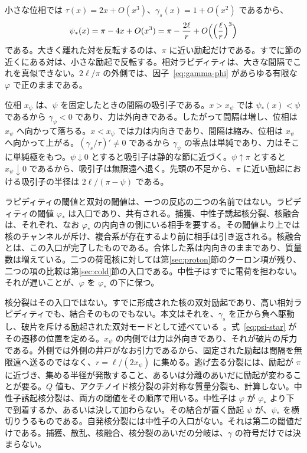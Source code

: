 \documentclass[a4paper]{article}
\begin{document}
小さな位相では \(\tau(x)=2x+O(x^{3})\)、\(\gamma_s(x)=1+O(x^{2})\) であるから、
\[
\psi_*(x)=\pi-4x+O(x^{3})=\pi-\frac{2\ell}{r}+O\Bigl(\Bigl(\frac{\ell}{r}\Bigr)^{3}\Bigr)
\]
である。大きく離れた対を反転するのは、\(\pi\) に近い励起だけである。すでに節の近くにある対は、小さな励起で反転する。相対ラピディティは、大きな間隔でこれを真似できない。\(2\ell/\pi\) の外側では、因子~\eqref{eq:gamma-phi} があらゆる有限な \(\varphi\) で正のままである。

位相 \(x_\psi\) は、\(\psi\) を固定したときの間隔の吸引子である。\(x>x_\psi\) では \(\psi_*(x)<\psi\) であるから \(\gamma_\psi<0\) であり、力は外向きである。したがって間隔は増し、位相は \(x_\psi\) へ向かって落ちる。\(x<x_\psi\) では力は内向きであり、間隔は縮み、位相は \(x_\psi\) へ向かって上がる。\((\gamma_s/\tau)'\neq 0\) であるから \(\gamma_\psi\) の零点は単純であり、力はそこに単純極をもつ。\(\psi\downarrow 0\) とすると吸引子は静的な節に近づく。\(\psi\uparrow\pi\) とすると \(x_\psi\downarrow 0\) であるから、吸引子は無限遠へ退く。先頭の不足から、\(\pi\) に近い励起における吸引子の半径は \(2\ell/(\pi-\psi)\) である。

ラピディティの閾値と双対の閾値は、一つの反応の二つの名前ではない。ラピディティの閾値 \(\varphi_*\) は入口であり、共有される。捕獲、中性子誘起核分裂、核融合は、それぞれ、なお \(\varphi_*\) の内向きの側にいる相手を要する。その閾値より上では核のチャンネルが斥け、複合系が存在するより前に相手は引き返される。核融合とは、この入口が完了したものである。合体した系は内向きのままであり、質量数は増えている。二つの荷電核に対しては第\ref{sec:proton}節のクーロン項が残り、二つの項の比較は第\ref{sec:cold}節の入口である。中性子はすでに電荷を担わない。それが遅いことが、\(\varphi\) を \(\varphi_*\) の下に保つ。

核分裂はその入口ではない。すでに形成された核の双対励起であり、高い相対ラピディティでも、結合そのものでもない。本文はそれを、\(\gamma_s\) を正から負へ駆動し、破片を斥ける励起された双対モードとして述べている~\cite{dst-main}。式~\eqref{eq:psi-star} がその遷移の位置を定める。\(x_\psi\) の内側では力は外向きであり、それが破片の斥力である。外側では外側の井戸がなお引力であるから、固定された励起は間隔を無限遠へ送るのではなく、\(r=\ell/(2x_\psi)\) に集める。逃げ去る分裂には、励起が \(\pi\) に近づき、集める半径が発散すること、あるいは分離のあいだに励起が変わることが要る。\(Q\) 値も、アクチノイド核分裂の非対称な質量分裂も、計算しない。中性子誘起核分裂は、両方の閾値をその順序で用いる。中性子は \(\varphi\) が \(\varphi_*\) より下で到着するか、あるいは決して加わらない。その結合が置く励起 \(\psi\) が、\(\psi_*\) を横切りうるものである。自発核分裂には中性子の入口がない。それは第二の閾値だけである。捕獲、散乱、核融合、核分裂のあいだの分岐は、\(\gamma\) の符号だけでは決まらない。
\end{document}
